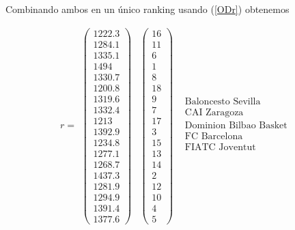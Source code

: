 	Combinando ambos en un único ranking usando (\ref{ODr}) obtenemos
	
		\[r=
		\begin{array}{ccc}
		\left(\begin{array}{c}
		    1222.3\\
		    1284.1\\
		    1335.1\\
		    1494\\
		    1330.7\\
		    1200.8\\
		    1319.6\\
		    1332.4\\
		    1213\\
		    1392.9\\
		    1234.8\\
		    1277.1\\
		    1268.7\\
		    1437.3\\
		    1281.9\\
		    1294.9\\
		    1391.4\\
		    1377.6
		\end{array} \right) & \left(\begin{array}{c}
		    16\\
		    11\\
		    6\\
		    1\\
		    8\\
		    18\\
		    9\\
		    7\\
		    17\\
		    3\\
		    15\\
		    13\\
		    14\\
		    2\\
		    12\\
		    10\\
		    4\\
		    5
		\end{array} \right) & \begin{array}{c}
		\text{Baloncesto Sevilla}\\
		\text{CAI Zaragoza} \\
		\text{Dominion Bilbao Basket} \\
		\text{FC Barcelona} \\
		\text{FIATC Joventut} \\

\end{array}
\end{array}\]
